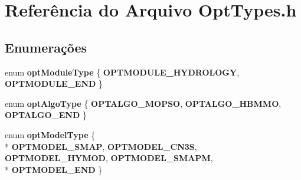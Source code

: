 \section{Referência do Arquivo Opt\+Types.\+h}
\label{_opt_types_8h}
\subsection*{Enumerações}
\begin{DoxyCompactItemize}
\item 
enum {\bf opt\+Module\+Type} \{ {\bf O\+P\+T\+M\+O\+D\+U\+L\+E\+\_\+\+H\+Y\+D\+R\+O\+L\+O\+GY}, 
{\bf O\+P\+T\+M\+O\+D\+U\+L\+E\+\_\+\+E\+ND}
 \}
\item 
enum {\bf opt\+Algo\+Type} \{ {\bf O\+P\+T\+A\+L\+G\+O\+\_\+\+M\+O\+P\+SO}, 
{\bf O\+P\+T\+A\+L\+G\+O\+\_\+\+H\+B\+M\+MO}, 
{\bf O\+P\+T\+A\+L\+G\+O\+\_\+\+E\+ND}
 \}
\item 
enum {\bf opt\+Model\+Type} \{ \\*
{\bf O\+P\+T\+M\+O\+D\+E\+L\+\_\+\+S\+M\+AP}, 
{\bf O\+P\+T\+M\+O\+D\+E\+L\+\_\+\+C\+N3S}, 
{\bf O\+P\+T\+M\+O\+D\+E\+L\+\_\+\+H\+Y\+M\+OD}, 
{\bf O\+P\+T\+M\+O\+D\+E\+L\+\_\+\+S\+M\+A\+PM}, 
\\*
{\bf O\+P\+T\+M\+O\+D\+E\+L\+\_\+\+E\+ND}
 \}
\end{DoxyCompactItemize}
